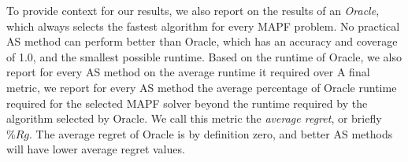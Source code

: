 \documentclass{ecai}
\newcommand{\Carmel}[1]{}
\newcommand{\Roni}[1]{}
\newcommand{\shortcite}[1]{\cite{#1}}
\begin{document}
To provide context for our results, we also report on the results of an \emph{Oracle}, which always selects the fastest algorithm for every MAPF problem. No practical AS method can perform better than Oracle, which has an accuracy and coverage of 1.0, and the smallest possible runtime. 
Based on the runtime of Oracle, we also report for every AS method on the average runtime it required over 
A final metric, we report for every AS method the average percentage of Oracle runtime required for the selected MAPF solver beyond the runtime required by the algorithm selected by Oracle. We call this metric the \emph{average regret}, or briefly $\%Rg$. 
The average regret of Oracle is by definition zero, and better AS methods will have lower average regret values. 






\end{document}
